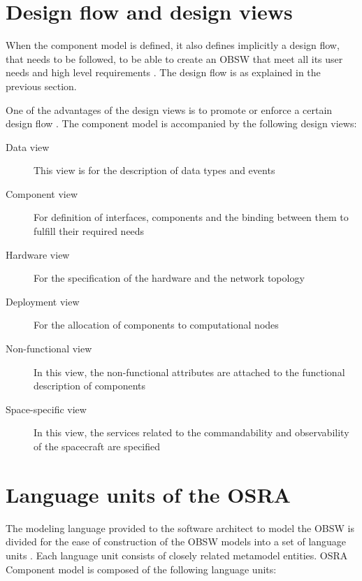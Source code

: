\section{Design flow and design views}
\label{section: Design flow and views}
When the component model is defined, it also defines implicitly a design flow, that needs to be followed, to be able to create an OBSW that meet all its user needs and high level requirements \cite{SAVOIR} \cite{PhdThesis} \cite{CompBasedProcess}. The design flow is as explained in the previous section. 

One of the advantages of the design views is to promote or enforce a certain design flow \cite{CompBasedProcess}. The component model is accompanied by the following design views:
\begin{description}
\item [Data view] This view is for the description of data types and events
\item [Component view] For definition of interfaces, components and the binding between them to fulfill their required needs
\item [Hardware view] For the specification of the hardware and the network topology
\item [Deployment view] For the allocation of components to computational nodes
\item [Non-functional view] In this view, the non-functional attributes are attached to the functional description of components
\item [Space-specific view] In this view, the services related to the commandability and observability of the spacecraft are specified
\end{description}  

\section{Language units of the OSRA}
\label{Language units}
The modeling language provided to the software architect to model the OBSW is divided for the ease of construction of the OBSW models into a set of language units \cite{SpecMetamodel}. Each language unit consists of closely related metamodel entities. OSRA Component model is composed of the following language units:

